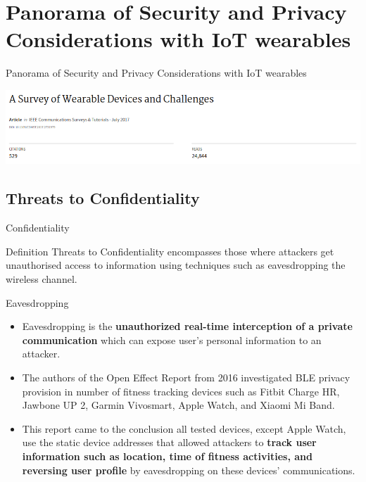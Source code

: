 \documentclass[ucs,9pt]{beamer}
\begin{document}
\section{Panorama of Security and Privacy Considerations with IoT wearables}

\begin{frame}[fragile]{Panorama of Security and Privacy Considerations with IoT wearables}

\includegraphics[width=1\linewidth]{imgs/ASurveyofWearableDevicesandChallenges}

\end{frame}


\subsection{Threats to Confidentiality}

\begin{frame}{Confidentiality}
	\begin{alertblock}{Definition}
	Threats to Confidentiality encompasses those where attackers get unauthorised  access to information using techniques such as eavesdropping  the wireless channel.	
	\end{alertblock}
	
	
	
\end{frame}

\begin{frame}{Eavesdropping}
	\begin{itemize}
		\item Eavesdropping is the \textbf{unauthorized real-time interception of a private communication} which can expose user’s personal information to an attacker.
		\item The authors of the Open Effect Report from 2016 \cite{b7} investigated BLE privacy provision in number of fitness tracking devices such as Fitbit Charge HR, Jawbone UP 2, Garmin Vivosmart, Apple Watch, and Xiaomi Mi Band.
		\item This report came to the conclusion all tested devices, except Apple Watch, use the static device addresses that allowed attackers to \textbf{track user information such as location, time of fitness activities, and reversing user profile} by eavesdropping on these devices’ communications.
	\end{itemize}
\end{frame}
\end{document}
